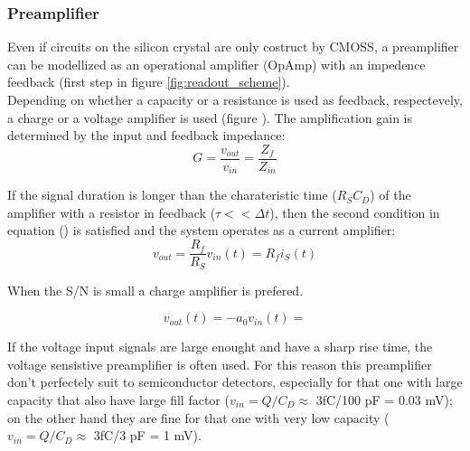 \begin{titlepage}
\subsubsection{Preamplifier}
Even if circuits on the silicon crystal are only costruct by CMOSS, a
preamplifier can be modellized as an operational amplifier (OpAmp) with an impedence
feedback (first step in figure \ref{fig:readout_scheme}).\\
Depending on whether a capacity or a resistance is used as feedback, respectevely,
a charge or a voltage amplifier is used (figure ).
The amplification gain is determined by the input and feedback impedance:
\begin{equation}
   G = \frac{v_{out}}{v_{in}} = \frac{Z_{f}}{Z_{in}}
\end{equation}

If the signal duration is longer than the charateristic time ($R_S C_D$) of the amplifier with
a resistor in feedback ($\tau << \Delta t$), then the second condition in equation () is satisfied
and the system operates as a current amplifier:
\begin{equation}
   v_{out} = \frac{R_f}{R_S}v_{in}(t) = R_{f}i_{S}(t)
\end{equation}

When the S/N is small a charge amplifier is prefered.

\begin{equation}
   v_{out}(t) = -a_{0}v_{in}(t) =
\end{equation}

If the voltage input signals are large enought and have a sharp rise time, the voltage
sensistive preamplifier is often used. For this reason this preamplifier don't
perfectely suit to semiconductor detectors, especially for that one with large capacity
that also have large fill factor ($v_{in} = Q/C_{D} \approx$ 3fC/100 pF = 0.03 mV); on the other hand they are fine for that one with
very low capacity ($v_{in} = Q/C_{D} \approx$ 3fC/3 pF = 1 mV).


\end{titlepage}
